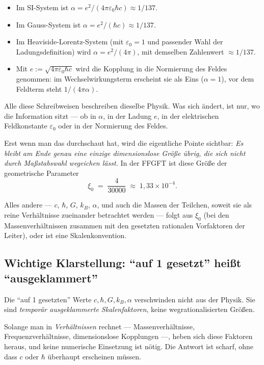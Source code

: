 \begin{itemize}\setlength\itemsep{0pt}
  \item Im SI-System ist $\alpha = e^{2}/(4\pi\varepsilon_{0}\hbar c) \approx 1/137$.
  \item Im Gauss-System ist $\alpha = e^{2}/(\hbar c) \approx 1/137$.
  \item Im Heaviside-Lorentz-System (mit $\varepsilon_{0} = 1$
        und passender Wahl der Ladungsdefinition) wird $\alpha = e^{2}/(4\pi)$,
        mit demselben Zahlenwert $\approx 1/137$.
  \item Mit $e := \sqrt{4\pi\varepsilon_{0}\hbar c}$ wird die Kopplung
        in die Normierung des Feldes genommen: im Wechselwirkungsterm
        erscheint sie als Eins ($\alpha = 1$), vor dem Feldterm steht
        $1/(4\pi\alpha)$.
\end{itemize}

Alle diese Schreibweisen beschreiben dieselbe Physik. Was sich
ändert, ist nur, wo die Information sitzt --- ob in $\alpha$, in der
Ladung $e$, in der elektrischen Feldkonstante $\varepsilon_{0}$ oder in
der Normierung des Feldes.

Erst wenn man das durchschaut hat, wird die eigentliche Pointe sichtbar:
\emph{Es bleibt am Ende genau eine einzige dimensionslose Größe übrig, die
sich nicht durch Maßstabswahl wegeichen lässt.} In der FFGFT ist diese
Größe der geometrische Parameter
\[
  \xi_{0} \;=\; \frac{4}{30000} \;\approx\; 1{,}33 \times 10^{-4}.
\]

Alles andere --- $c$, $\hbar$, $G$, $k_B$, $\alpha$, und auch die Massen
der Teilchen, soweit sie als reine Verhältnisse zueinander betrachtet werden ---
folgt aus $\xi_{0}$ (bei den Massenverhältnissen zusammen mit den
gesetzten rationalen Vorfaktoren der Leiter), oder ist eine
Skalenkonvention.

\subsection*{Wichtige Klarstellung: ``auf 1 gesetzt'' heißt ``ausgeklammert''}

Die ``auf 1 gesetzten'' Werte $c, \hbar, G, k_B, \alpha$ verschwinden
nicht aus der Physik. Sie sind \emph{temporär ausgeklammerte
Skalenfaktoren}, keine wegrationalisierten Größen.

Solange man in \emph{Verhältnissen} rechnet --- Massenverhältnisse,
Frequenzverhältnisse, dimensionslose Kopplungen ---, heben sich diese
Faktoren heraus, und keine numerische Einsetzung ist nötig. Die Antwort
ist scharf, ohne dass $c$ oder $\hbar$ überhaupt erscheinen müssen.

